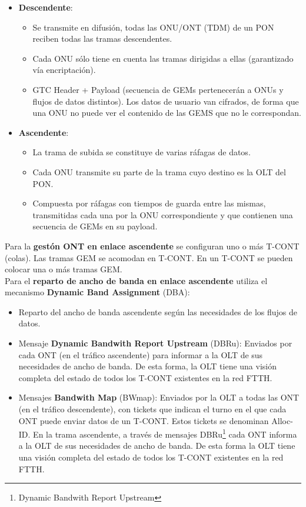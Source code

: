 \documentclass[10pt,portrait, twocolumn]{article}
\begin{document}
	\begin{itemize}
	\item \textbf{Descendente}: 
		\begin{itemize}
		\item Se transmite en difusión, todas las ONU/ONT (TDM) de un PON reciben todas las tramas descendentes.
		\item Cada ONU sólo tiene en cuenta las tramas dirigidas a ellas (garantizado vía encriptación).
		\item GTC Header + Payload (secuencia de GEMs pertenecerán a ONUs y flujos de datos distintos). Los datos de usuario van cifrados, de forma que una ONU no puede ver el contenido de las GEMS que no le correspondan.
		\end{itemize}
		\item \textbf{Ascendente}:
			\begin{itemize}
			\item La trama de subida se constituye de varias ráfagas de datos.
			\item Cada ONU transmite su parte de la trama cuyo destino es la OLT del PON.
			\item Compuesta por ráfagas con tiempos de guarda entre las mismas, transmitidas cada una por la ONU correspondiente y que contienen una secuencia de GEMs en su payload.
			\end{itemize}
	\end{itemize}

Para la \textbf{gestón ONT en enlace ascendente} se configuran uno o más T-CONT (colas). Las tramas GEM se acomodan en T-CONT. En un T-CONT se pueden colocar una o más tramas GEM.\\

Para el \textbf{reparto de ancho de banda en enlace ascendente} utiliza el mecanismo \textbf{Dynamic Band Assignment} (DBA):

	\begin{itemize}
	\item Reparto del ancho de banda ascendente según las necesidades de los flujos de datos.
	\item Mensaje \textbf{Dynamic Bandwith Report Upstream} (DBRu): Enviados por cada ONT (en el tráfico ascendente) para informar a la OLT de sus necesidades de ancho de banda. De esta forma, la OLT tiene una visión completa del estado de todos los T-CONT existentes en la red FTTH.
	\item Mensajes \textbf{Bandwith Map} (BWmap): Enviados por la OLT a todas las ONT (en el tráfico descendente), con tickets que indican el turno en el que cada ONT puede enviar datos de un T-CONT. Estos tickets se denominan Alloc-ID. En la trama ascendente, a través de mensajes DBRu\footnote{Dynamic Bandwith Report Upstream} cada ONT informa a la OLT de sus necesidades de ancho de banda. De esta forma la OLT tiene una visión completa del estado de todos los T-CONT existentes en la red FTTH.
	\end{itemize}
	
\end{document}
